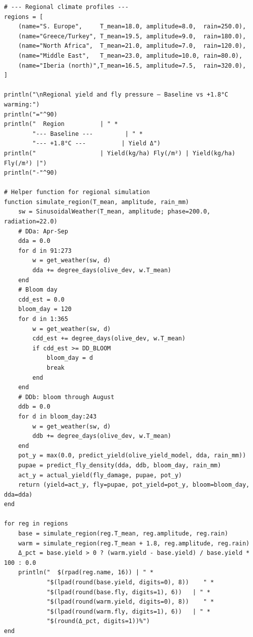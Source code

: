 \begin{verbatim}
# --- Regional climate profiles ---
regions = [
    (name="S. Europe",     T_mean=18.0, amplitude=8.0,  rain=250.0),
    (name="Greece/Turkey", T_mean=19.5, amplitude=9.0,  rain=180.0),
    (name="North Africa",  T_mean=21.0, amplitude=7.0,  rain=120.0),
    (name="Middle East",   T_mean=23.0, amplitude=10.0, rain=80.0),
    (name="Iberia (north)",T_mean=16.5, amplitude=7.5,  rain=320.0),
]

println("\nRegional yield and fly pressure — Baseline vs +1.8°C warming:")
println("="^90)
println("  Region          | " *
        "--- Baseline ---         | " *
        "--- +1.8°C ---          | Yield Δ")
println("                  | Yield(kg/ha) Fly(/m²) | Yield(kg/ha) Fly(/m²) |")
println("-"^90)

# Helper function for regional simulation
function simulate_region(T_mean, amplitude, rain_mm)
    sw = SinusoidalWeather(T_mean, amplitude; phase=200.0, radiation=22.0)
    # DDa: Apr-Sep
    dda = 0.0
    for d in 91:273
        w = get_weather(sw, d)
        dda += degree_days(olive_dev, w.T_mean)
    end
    # Bloom day
    cdd_est = 0.0
    bloom_day = 120
    for d in 1:365
        w = get_weather(sw, d)
        cdd_est += degree_days(olive_dev, w.T_mean)
        if cdd_est >= DD_BLOOM
            bloom_day = d
            break
        end
    end
    # DDb: bloom through August
    ddb = 0.0
    for d in bloom_day:243
        w = get_weather(sw, d)
        ddb += degree_days(olive_dev, w.T_mean)
    end
    pot_y = max(0.0, predict_yield(olive_yield_model, dda, rain_mm))
    pupae = predict_fly_density(dda, ddb, bloom_day, rain_mm)
    act_y = actual_yield(fly_damage, pupae, pot_y)
    return (yield=act_y, fly=pupae, pot_yield=pot_y, bloom=bloom_day, dda=dda)
end

for reg in regions
    base = simulate_region(reg.T_mean, reg.amplitude, reg.rain)
    warm = simulate_region(reg.T_mean + 1.8, reg.amplitude, reg.rain)
    Δ_pct = base.yield > 0 ? (warm.yield - base.yield) / base.yield * 100 : 0.0
    println("  $(rpad(reg.name, 16)) | " *
            "$(lpad(round(base.yield, digits=0), 8))    " *
            "$(lpad(round(base.fly, digits=1), 6))   | " *
            "$(lpad(round(warm.yield, digits=0), 8))    " *
            "$(lpad(round(warm.fly, digits=1), 6))   | " *
            "$(round(Δ_pct, digits=1))%")
end
\end{verbatim}




